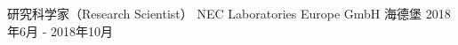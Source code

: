 \cventry
{研究科学家（Research Scientist）} %
{NEC Laboratories Europe GmbH} %
{海德堡} %
{2018年6月 - 2018年10月} %
{ %
}

